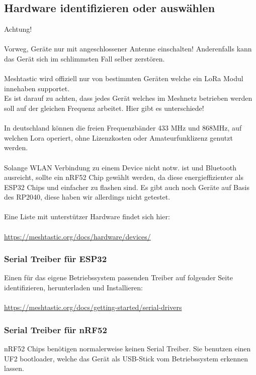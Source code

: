 \documentclass[12pt,a4paper]{article}
\begin{document}
\subsection{Hardware identifizieren oder auswählen}
Achtung!\\ \\
Vorweg, Geräte nur mit angeschlossener Antenne einschalten! Anderenfalls kann das Gerät sich im schlimmsten Fall selber zerstören.\\
\\
Meshtastic wird offiziell nur von bestimmten Geräten welche ein LoRa Modul innehaben supportet.\\
Es ist darauf zu achten, dass jedes Gerät welches im Meshnetz betrieben werden soll auf der gleichen Frequenz arbeitet. Hier gibt es unterschiede!\\
\\
In deutschland können die freien Frequenzbänder 433 MHz und 868MHz, auf welchen Lora operiert, ohne Lizenzkosten oder Amateurfunklizenz genutzt werden.\\
\\
Solange WLAN Verbindung zu einem Device nicht notw. ist und Bluetooth ausreicht, sollte ein nRF52 Chip gewählt werden, da diese energieffizienter als ESP32 Chips und einfacher zu flashen sind. Es gibt auch noch Geräte auf Basis des RP2040, diese haben wir allerdings nicht getestet.\\
\\
Eine Liste mit unterstützer Hardware findet sich hier:\\
\\
\url{https://meshtastic.org/docs/hardware/devices/}

\subsubsection{Serial Treiber für ESP32}
Einen für das eigene Betriebssystem passenden Treiber auf folgender Seite identifizieren, herunterladen und Installieren:\\
\\
\url{https://meshtastic.org/docs/getting-started/serial-drivers}

\subsubsection{Serial Treiber für nRF52}
nRF52 Chips benötigen normalerweise keinen Serial Treiber. Sie benutzen einen UF2 bootloader, welche das Gerät als USB-Stick vom Betriebssystem erkennen lassen.
\end{document}
